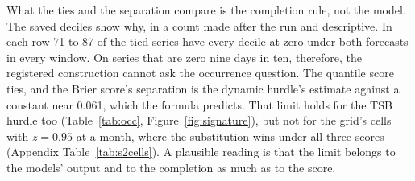What the ties and the separation compare is the completion rule, not the model. The saved deciles show why, in
a count made after the run and descriptive. In each row 71 to 87 of the tied series have every decile at zero
under both forecasts in every window. On series that are zero nine days in ten, therefore, the registered
construction cannot ask the occurrence question. The quantile score ties, and the Brier score's separation is
the dynamic hurdle's estimate against a constant near 0.061, which the formula predicts. That limit holds for
the TSB hurdle too (Table~\ref{tab:occ}, Figure~\ref{fig:signature}), but not for the grid's cells with $z =
0.95$ at a month, where the substitution wins under all three scores (Appendix Table~\ref{tab:s2cells}). A
plausible reading is that the limit belongs to the models' output and to the completion as much as to the
score.

